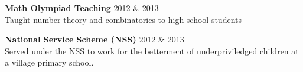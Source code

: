 \documentclass[10pt]{article}
\renewcommand{\section}[1]{\pagebreak[3]%
    \hyphenpenalty=10000%
    \vspace{1.3\baselineskip}%
    \phantomsection\addcontentsline{toc}{section}{#1}%
    \noindent\llap{\scshape\smash{\parbox[t]{\marginparwidth}{\raggedright #1}}}%
    \vspace{-\baselineskip}\par}
\newcommand{\halfblankline}{\quad\vspace{-0.4\baselineskip}\pagebreak[3]}
\begin{document}
\textbf{Math Olympiad Teaching} \hfill 2012 \& 2013\\
Taught number theory and combinatorics to high school students
\\ \halfblankline

\textbf{National Service Scheme (NSS)} \hfill 2012 \& 2013\\
Served under the NSS to work for the betterment of underpriviledged children at a
village primary school.


\end{document}
